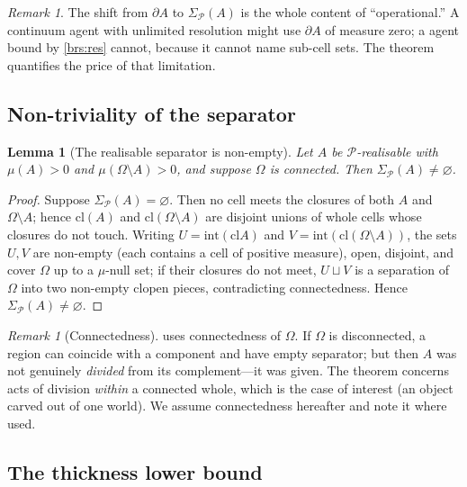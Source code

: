 \documentclass[11pt,twocolumn,a4paper]{article}
\theoremstyle{thmstyle}
\newtheorem{lemma}[theorem]{Lemma}
\theoremstyle{definition}
\theoremstyle{remark}
\newtheorem{remark}[theorem]{Remark}
\newcommand{\Space}{\Omega}
\newcommand{\Bdy}{\partial}
\newcommand{\interior}{\mathrm{int}}
\newcommand{\cl}{\mathrm{cl}}
\newcommand{\Part}{\mathscr{P}}
\begin{document}
\begin{remark}
The shift from $\Bdy A$ to $\Sigma_\Part(A)$ is the whole content of
``operational.'' A continuum agent with unlimited resolution might use $\Bdy A$
of measure zero; a agent bound by \ref{brs:res} cannot, because it cannot name
sub-cell sets. The theorem quantifies the price of that limitation.
\end{remark}

\subsection{Non-triviality of the separator}

\begin{lemma}[The realisable separator is non-empty]
\label{lem:nonempty-sep}
Let $A$ be $\Part$-realisable with $\mu(A)>0$ and $\mu(\Space\setminus A)>0$, and
suppose $\Space$ is connected. Then $\Sigma_\Part(A)\neq\varnothing$.
\end{lemma}

\begin{proof}
Suppose $\Sigma_\Part(A)=\varnothing$. Then no cell meets the closures of both
$A$ and $\Space\setminus A$; hence $\cl(A)$ and $\cl(\Space\setminus A)$ are
disjoint unions of whole cells whose closures do not touch. Writing
$U=\interior(\cl A)$ and $V=\interior(\cl(\Space\setminus A))$, the sets $U,V$
are non-empty (each contains a cell of positive measure), open, disjoint, and
cover $\Space$ up to a $\mu$-null set; if their closures do not meet, $U\sqcup V$
is a separation of $\Space$ into two non-empty clopen pieces, contradicting
connectedness. Hence $\Sigma_\Part(A)\neq\varnothing$.
\end{proof}

\begin{remark}[Connectedness]
 uses connectedness of $\Space$. If $\Space$ is
disconnected, a region can coincide with a component and have empty separator;
but then $A$ was not genuinely \emph{divided} from its complement---it was given.
The theorem concerns acts of division \emph{within} a connected whole, which is
the case of interest (an object carved out of one world). We assume connectedness
hereafter and note it where used.
\end{remark}

\subsection{The thickness lower bound}
\end{document}
